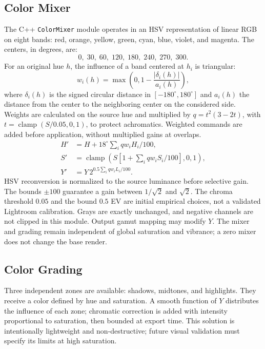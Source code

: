 \subsection{Color Mixer}

The C++ \texttt{ColorMixer} module operates in an HSV representation of linear RGB on eight bands: red, orange, yellow, green, cyan, blue, violet, and magenta. The centers, in degrees, are:
\[0,\;30,\;60,\;120,\;180,\;240,\;270,\;300.\]
For an original hue $h$, the influence of a band centered at $h_i$ is triangular:
\begin{equation}
  w_i(h)=\max\left(0,1-\frac{|\delta_i(h)|}{a_i(h)}\right),
\end{equation}
where $\delta_i(h)$ is the signed circular distance in $[-180^\circ,180^\circ]$ and $a_i(h)$ the distance from the center to the neighboring center on the considered side. Weights are calculated on the source hue and multiplied by $q=t^2(3-2t)$, with $t=\operatorname{clamp}(S/0.05,0,1)$, to protect achromatics. Weighted commands are added before application, without multiplied gains at overlaps.
\begin{align}
 H'&=H+18^\circ\sum_i qw_iH_i/100,\\
 S'&=\operatorname{clamp}\left(S\left[1+\sum_i qw_iS_i/100\right],0,1\right),\\
 Y'&=Y\,2^{0.5\sum_i qw_iL_i/100}.
\end{align}
HSV reconversion is normalized to the source luminance before selective gain. The bounds $\pm100$ guarantee a gain between $1/\sqrt{2}$ and $\sqrt{2}$. The chroma threshold $0.05$ and the bound $0.5$ EV are initial empirical choices, not a validated Lightroom calibration. Grays are exactly unchanged, and negative channels are not clipped in this module. Output gamut mapping may modify $Y$. The mixer and grading remain independent of global saturation and vibrance; a zero mixer does not change the base render.

\subsection{Color Grading}

Three independent zones are available: shadows, midtones, and highlights. They receive a color defined by hue and saturation. A smooth function of $Y$ distributes the influence of each zone; chromatic correction is added with intensity proportional to saturation, then bounded at export time. This solution is intentionally lightweight and non-destructive; future visual validation must specify its limits at high saturation.

